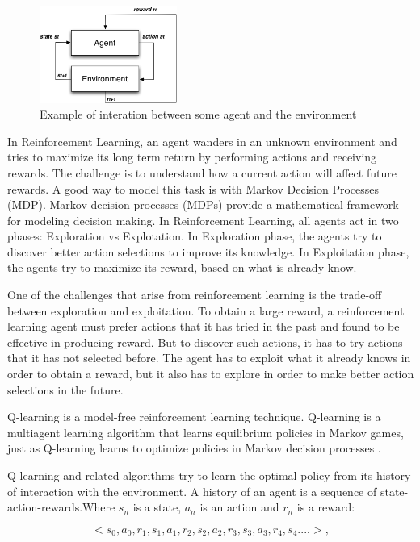 \documentclass{report}
\begin{document}
\begin{figure}
\centering
\includegraphics[width=0.4\textwidth]{./images/agentenv.png}
\caption{Example of interation between some agent and the environment}
\label{fig:agentenv}
\end{figure}

In Reinforcement Learning, an agent wanders in an unknown environment and tries to maximize its long term return by performing actions and receiving rewards. The challenge is to understand how a current action will affect future rewards. A good way to model this task is with Markov Decision Processes (MDP). Markov decision processes (MDPs) provide a mathematical framework for modeling decision making. In Reinforcement Learning, all agents act in two phases: Exploration vs Explotation. In Exploration phase, the agents try to discover better action selections to improve its knowledge. In Exploitation phase, the agents try to maximize its reward, based on what is already know.

One of the challenges that arise from reinforcement learning is the trade-off between exploration and exploitation. To obtain a large reward, a reinforcement learning
agent must prefer actions that it has tried in the past and found to be effective in producing reward. But to discover such actions, it has to try actions that it has not selected before. The agent has to exploit what it already knows in order to obtain a reward, but it also has to explore in order to make better action selections in the future.

Q-learning is a model-free reinforcement learning technique. Q-learning is a multiagent learning algorithm that learns equilibrium policies in Markov games, just as Q-learning learns to optimize policies in Markov decision processes \cite{Greenwald2003}.

Q-learning and related algorithms try to learn the optimal policy from its history of interaction with the environment. A history of an agent is a sequence of state-action-rewards.Where $s_{n}$ is a state, $a_{n}$ is an action and $r_{n}$ is a reward:

\begin{equation}
<s_{0},a_{0},r_{1},s_{1},a_{1},r_{2},s_{2},a_{2},r_{3},s_{3},a_{3},r_{4},s_{4}....>,
\end{equation}
\end{document}
